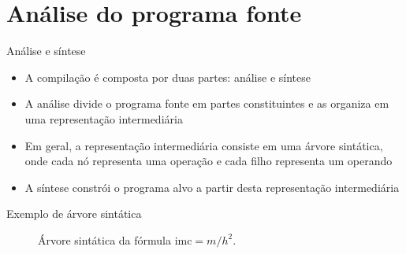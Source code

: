 \section{Análise do programa fonte}

\begin{frame}[fragile]{Análise e síntese}

    \begin{itemize}
        \item A compilação é composta por duas partes: análise e síntese

        \item A análise divide o programa fonte em partes constituintes e as organiza em uma representação intermediária

        \item Em geral, a representação intermediária consiste em uma árvore sintática, onde cada nó representa uma operação e cada filho representa um
            operando

        \item A síntese constrói o programa alvo a partir desta representação intermediária
    \end{itemize}

\end{frame}

\begin{frame}[fragile]{Exemplo de árvore sintática}

    \begin{figure}
        \centering


        \caption{Árvore sintática da fórmula $\mathrm{imc} = m/h^2$.}
    \end{figure}

\end{frame}

